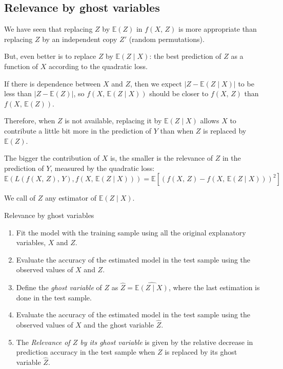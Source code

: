 \subsection{Relevance by ghost variables}

We have seen that replacing $Z$ by $\mathds{E}(Z)$ in $f(X,\,Z)$ is
more appropriate than replacing $Z$ by an independent copy $Z'$ (random
permutations).

\begin{note}
	But, even better is to replace $Z$ by $\mathds{E}(Z \mid X)$:
	the best prediction of $Z$ as a function of $X$ according to the
	quadratic loss.
\end{note}

If there is dependence between $X$ and $Z$, then we expect $\left|Z - \mathds{E}(Z \mid X)\right|$
to be less than $\left|Z - \mathds{E}(Z)\right|$, so
$f(X,\,\mathds{E}(Z \mid X))$ should be closer to $f(X,\,Z)$ than
$f(X,\,\mathds{E}(Z))$.

Therefore, when $Z$ is not available, replacing it by $\mathds{E}(Z \mid X)$
allows $X$ to contribute a little bit more in the prediction of $Y$ than
when $Z$ is replaced by $\mathds{E}(Z)$.

The bigger the contribution of $X$ is, the smaller is the relevance of $Z$
in  the prediction of $Y$, measured by the quadratic loss:
\begin{equation*}
	\mathds{E}(L(f(X,\,Z),\,Y),f(X,\,\mathds{E}(Z \mid X))) =
	\mathds{E} \left[ (f(X,\,Z) - f(X,\,\mathds{E}(Z \mid X)))^2 \right]
\end{equation*}

\begin{marker}
	We call  of $Z$ any estimator of $\mathds{E}(Z \mid X)$.
\end{marker}

\begin{algorithm}{Relevance by ghost variables}{}
	\begin{enumerate}
		\item Fit the model with the training sample using all the original explanatory variables,
		      $X$ and $Z$.
		\item Evaluate the accuracy of the estimated model in the test sample using the observed values
		      of $X$ and $Z$.
		\item Define the \emph{ghost variable} of $Z$ as $\widehat{Z} = \widehat{\mathds{E}(Z \mid X)}$,
		      where the last estimation is done in the test sample.
		\item Evaluate the accuracy of the estimated model in the test sample using
		      the observed values of $X$ and the ghost variable $\widehat{Z}$.
		\item The \emph{Relevance of $Z$ by its ghost variable} is given by the relative
		      decrease in prediction accuracy in the test sample when $Z$ is replaced by
		      its ghost variable $\widehat{Z}$.
	\end{enumerate}
\end{algorithm}


